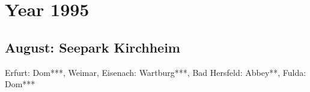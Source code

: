 \chapter{Year 1995}
\label{1995}

\section{August: Seepark Kirchheim}
\label{1995:Kirchheim}


Erfurt: Dom***, Weimar, Eisenach: Wartburg***, Bad Hersfeld: Abbey**, Fulda: Dom***